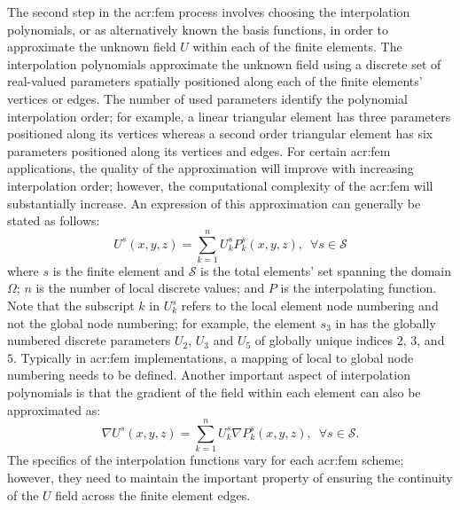 The second step in the \gls{acr:fem} process involves choosing the interpolation polynomials, or as alternatively known the basis functions, in order to approximate the unknown field $U$ within each of the finite elements.
The interpolation polynomials approximate the unknown field using a discrete set of real-valued parameters spatially positioned along each of the finite elements' vertices or edges.
The number of used parameters identify the polynomial interpolation order; for example, a linear triangular element has three parameters positioned along its vertices whereas a second order triangular element has six parameters positioned along its vertices and edges.
For certain \gls{acr:fem} applications, the quality of the approximation will improve with increasing interpolation order; however, the computational complexity of the \gls{acr:fem} will substantially increase.
An expression of this approximation can generally be stated as follows:
\begin{equation}
	U^s(x,y,z) = \sum_{k=1}^{n} U^s_k P^s_k(x,y,z), \,\,\, \forall s \in \mathcal{S}
	\label{eqn:intrPoly}
\end{equation}
where $s$ is the finite element and $\mathcal{S}$ is the total elements' set spanning the domain $\Omega$; $n$ is the number of local discrete values; and $P$ is the interpolating function.
Note that the subscript $k$ in $U^s_k$ refers to the local element node numbering and not the global node numbering; for example, the element $s_3$ in  has the globally numbered discrete parameters $U_2$, $U_3$ and $U_5$ of globally unique indices $2$, $3$, and $5$.
Typically in \gls{acr:fem} implementations, a mapping of local to global node numbering needs to be defined.
Another important aspect of interpolation polynomials is that the gradient of the field within each element can also be approximated as:
\begin{equation}
	\nabla U^s(x,y,z) = \sum_{k=1}^{n} U^s_k \nabla P^s_k(x,y,z), \,\,\, \forall s \in \mathcal{S}.
	\label{eqn:intrPolyGrad}
\end{equation}
The specifics of the interpolation functions vary for each \gls{acr:fem} scheme; however, they need to maintain the important property of ensuring the continuity of the $U$ field across the finite element edges.


